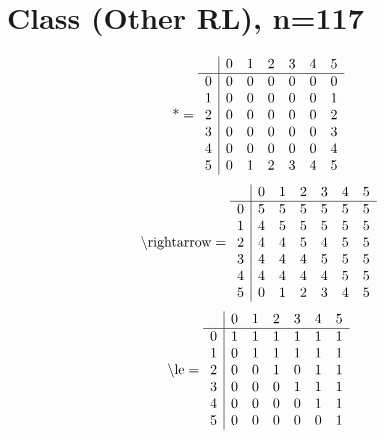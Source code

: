 \documentclass[11pt]{article}
\begin{document}
\section{Class (Other RL), n=117}
\[\text{*} = 
\begin{array}{r | r r r r r r}
 & 0 & 1 & 2 & 3 & 4 & 5 \\ \hline
0 & 0 & 0 & 0 & 0 & 0 & 0 \\
1 & 0 & 0 & 0 & 0 & 0 & 1 \\
2 & 0 & 0 & 0 & 0 & 0 & 2 \\
3 & 0 & 0 & 0 & 0 & 0 & 3 \\
4 & 0 & 0 & 0 & 0 & 0 & 4 \\
5 & 0 & 1 & 2 & 3 & 4 & 5 \\
\end{array}
\]
\[\text{\textbackslash rightarrow} = 
\begin{array}{r | r r r r r r}
 & 0 & 1 & 2 & 3 & 4 & 5 \\ \hline
0 & 5 & 5 & 5 & 5 & 5 & 5 \\
1 & 4 & 5 & 5 & 5 & 5 & 5 \\
2 & 4 & 4 & 5 & 4 & 5 & 5 \\
3 & 4 & 4 & 4 & 5 & 5 & 5 \\
4 & 4 & 4 & 4 & 4 & 5 & 5 \\
5 & 0 & 1 & 2 & 3 & 4 & 5 \\
\end{array}
\]
\[\text{\textbackslash le} = 
\begin{array}{r | r r r r r r}
 & 0 & 1 & 2 & 3 & 4 & 5 \\ \hline
0 & 1 & 1 & 1 & 1 & 1 & 1 \\
1 & 0 & 1 & 1 & 1 & 1 & 1 \\
2 & 0 & 0 & 1 & 0 & 1 & 1 \\
3 & 0 & 0 & 0 & 1 & 1 & 1 \\
4 & 0 & 0 & 0 & 0 & 1 & 1 \\
5 & 0 & 0 & 0 & 0 & 0 & 1 \\
\end{array}
\]
\end{document}
